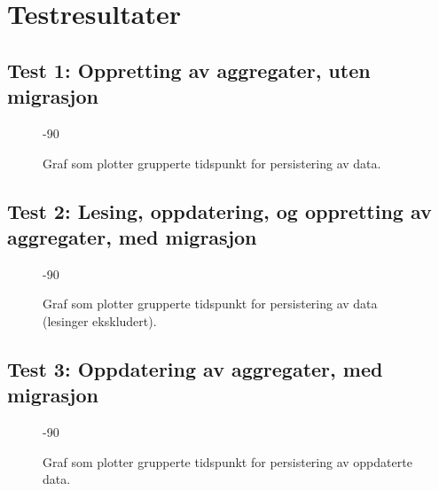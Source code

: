 \section{Testresultater} \label{testing}

\subsection{Test 1: Oppretting av aggregater, uten migrasjon}




\begin{figure}[hbtp]
  \begin{turn}{-90}
    
   \end{turn}{-90}
  \caption{Graf som plotter grupperte tidspunkt for persistering av data.}
  \label{plott1}
\end{figure}

\subsection{Test 2: Lesing, oppdatering, og oppretting av aggregater, med migrasjon}




\begin{figure}[hbtp]
  \begin{turn}{-90}
    
   \end{turn}{-90}
  \caption{Graf som plotter grupperte tidspunkt for persistering av data (lesinger ekskludert).}
  \label{plott2}
\end{figure}

\subsection{Test 3: Oppdatering av aggregater, med migrasjon}




\begin{figure}[hbtp]
  \begin{turn}{-90}
    
   \end{turn}{-90}
  \caption{Graf som plotter grupperte tidspunkt for persistering av oppdaterte data.}
  \label{plott3}
\end{figure}


